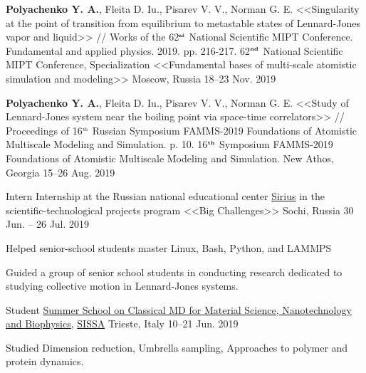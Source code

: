 \begin{cventries}

  \cventry
    {\textbf{Polyachenko Y. A.}, Fleita D. Iu., Pisarev V. V., Norman G. E. <<Singularity at the point of transition from equilibrium to metastable states of Lennard-Jones vapor and liquid>> // Works of the 62$^{\texttt{\tiny nd}}$ National Scientific MIPT Conference. Fundamental and applied physics. 2019. pp. 216-217.} %
    {62$^{\textbf{\tiny nd}}$ National Scientific MIPT Conference, Specialization <<Fundamental bases of multi-scale atomistic simulation and modeling>>} %
    {Moscow, Russia} %
    {18--23 Nov. 2019} %
    {}


  \cventry
    {\textbf{Polyachenko Y. A.}, Fleita D. Iu., Pisarev V. V., Norman G. E. <<Study of Lennard-Jones system near the boiling point via space-time correlators>> // Proceedings of 16$^{\texttt{\tiny th}}$ Russian Symposium FAMMS-2019 Foundations of Atomistic Multiscale Modeling and Simulation. p. 10.} %
    {16$^{\textbf{\tiny th}}$ Symposium FAMMS-2019 Foundations of Atomistic Multiscale Modeling and Simulation.} %
    {New Athos, Georgia} %
    {15--26 Aug. 2019} %
    {}
    
  \cventry
    {Intern} %
    {Internship at the Russian national educational center \href{https://sochisirius.ru/uploads/f/SiriusAnnualReport2019_en.pdf}{Sirius} in the scientific-technological projects program <<Big Challenges>>} %
    {Sochi, Russia} %
    {30 Jun. -- 26 Jul. 2019} %
    {
      \begin{cvitems} %
        \item {Helped senior-school students master Linux, Bash, Python, and LAMMPS}
        \item {Guided a group of senior school students in conducting research dedicated to studying collective motion in Lennard-Jones systems.}
      \end{cvitems}
    }

  \cventry
    {Student} %
    {\href{https://www.cecam.org/workshop-details/135}{Summer School on Classical MD for Material Science, Nanotechnology and Biophysics}, \href{https://www.sissa.it/}{SISSA}} %
    {Trieste, Italy} %
    {10--21 Jun. 2019} %
    {
      \begin{cvitems} %
        \item {Studied Dimension reduction, Umbrella sampling, Approaches to polymer and protein dynamics.}
      \end{cvitems}
    }
    

\end{cventries}
